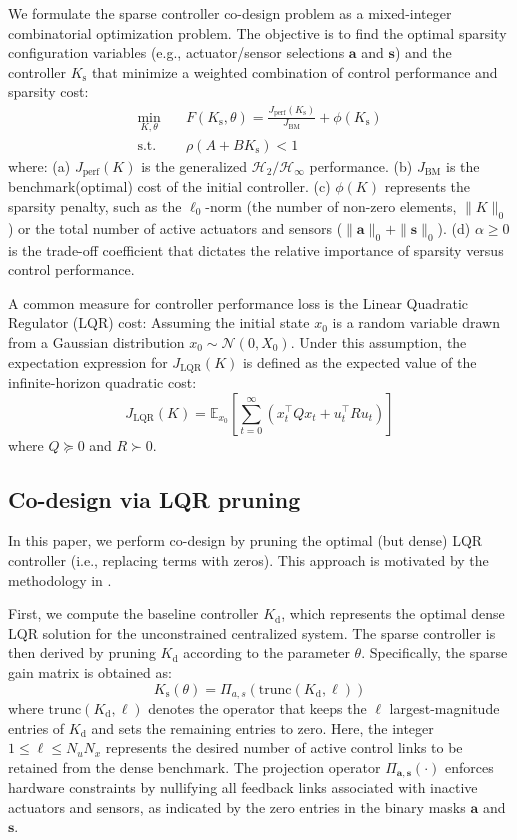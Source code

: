 \documentclass[conference]{IEEEtran}
\begin{document}
We formulate the sparse controller co-design problem as a mixed-integer combinatorial optimization problem. The objective is to find the optimal sparsity configuration variables (e.g., actuator/sensor selections $\mathbf{a}$ and $\mathbf{s}$) and the controller $K_\mathrm{s}$ that minimize a weighted combination of control performance and sparsity cost:
$$\begin{aligned}
\min_{K, \theta} \quad & F(K_{\text{s}}, \theta) = \frac{J_{\text{perf}}(K_{\text{s}})}{J_{\text{BM}}} +  \phi(K_{\text{s}}) \\
\text{s.t.} \quad & \rho(A + B K_{\text{s}}) < 1 
\end{aligned}$$
where: (a) $J_{\text{perf}}(K)$ is the generalized $\mathcal{H}_2 / \mathcal{H}_\infty$ performance. (b) $J_{\text{BM}}$ is the benchmark(optimal) cost of the initial controller. (c) $\phi(K)$ represents the sparsity penalty, such as the $\ell_0$-norm (the number of non-zero elements, $\|K\|_0$) or the total number of active actuators and sensors ($\|\mathbf{a}\|_0 + \|\mathbf{s}\|_0$). (d) $\alpha \ge 0$ is the trade-off coefficient that dictates the relative importance of sparsity versus control performance.

A common measure for controller performance loss is the Linear Quadratic Regulator (LQR) cost: Assuming the initial state $x_0$ is a random variable drawn from a Gaussian distribution $x_0 \sim \mathcal{N}(0, X_0)$. Under this assumption, the expectation expression for $J_{\text{LQR}}(K)$ is defined as the expected value of the infinite-horizon quadratic cost:$$J_{\text{LQR}}(K) = \mathbb{E}_{x_0} \left[ \sum_{t=0}^{\infty} \left( x_t^\top Q x_t + u_t^\top R u_t \right) \right]$$
where $Q \succeq 0$ and $R \succ 0$.
\subsection{Co-design via LQR pruning}

In this paper, we perform co-design by pruning the optimal (but dense) LQR controller (i.e., replacing terms with zeros). This approach is motivated by the methodology in \cite{shin}.

First, we compute the baseline controller $K_{\mathrm{d}}$, which represents the optimal dense LQR solution for the unconstrained centralized system. The sparse controller is then derived by pruning $K_{\mathrm{d}}$ according to the parameter $\theta$. Specifically, the sparse gain matrix is obtained as:
\begin{equation} \label{eq:ks}
K_\mathrm{s}(\theta) = \Pi_{a,s} \left( \text{trunc}(K_{\mathrm{d}}, \ell) \right)
\end{equation}
where $\text{trunc}(K_{\mathrm{d}}, \ell)$ denotes the operator that keeps the $\ell$ largest-magnitude entries of $K_{\mathrm{d}}$ and sets the remaining entries to zero. Here, the integer $1 \leq \ell \leq N_u N_x$ represents the desired number of active control links to be retained from the dense benchmark. The projection operator $\Pi_{\mathbf{a},\mathbf{s}}(\cdot)$ enforces hardware constraints by nullifying all feedback links associated with inactive actuators and sensors, as indicated by the zero entries in the binary masks $\mathbf{a}$ and $\mathbf{s}$.
\end{document}

